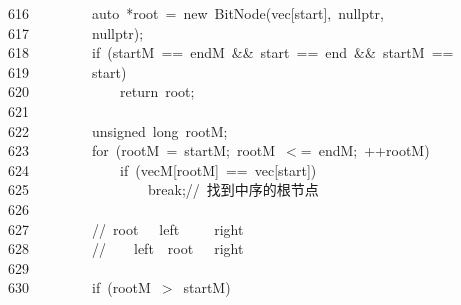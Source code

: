 \documentclass[11pt,a4paper]{ctexart}
\newcommand{\hlstd}[1]{\textcolor[rgb]{0.2,0.2,0.2}{#1}}
\newcommand{\hlslc}[1]{\textcolor[rgb]{0.59,0.59,0.59}{#1}}
\newcommand{\hlopt}[1]{\textcolor[rgb]{0.2,0.2,0.2}{#1}}
\newcommand{\hllin}[1]{\textcolor[rgb]{0.59,0.59,0.59}{#1}}
\newcommand{\hlkwa}[1]{\textcolor[rgb]{0.23,0.42,0.78}{#1}}
\newcommand{\hlkwb}[1]{\textcolor[rgb]{0.63,0,0.31}{#1}}
\newcommand{\hlkwc}[1]{\textcolor[rgb]{0,0.63,0.31}{#1}}
\newcommand{\hlkwd}[1]{\textcolor[rgb]{0.78,0.23,0.41}{#1}}
\begin{document}
\hllin{616\ }\hlstd{}\hlstd{\ \ \ \ \ \ \ \ }\hlstd{}\hlkwc{auto\ }\hlstd{}\hlopt{{*}}\hlstd{root\ }\hlopt{=\ }\hlstd{}\hlkwa{new\ }\hlstd{}\hlkwd{BitNode}\hlstd{}\hlopt{(}\hlstd{vec}\hlopt{{[}}\hlstd{start}\hlopt{{]},\ }\hlstd{}\hlkwc{nullptr}\hlstd{}\hlopt{,\ }\Righttorque\\
\hllin{617\ }\hlstd{}\hlstd{\ \ \ \ \ \ \ \ }\hlstd{}\hlkwc{nullptr}\hlstd{}\hlopt{);}\\
\hllin{618\ }\hlstd{}\hlstd{\ \ \ \ \ \ \ \ }\hlstd{}\hlkwa{if\ }\hlstd{}\hlopt{(}\hlstd{startM\ }\hlopt{==\ }\hlstd{endM\ }\hlopt{\&\&\ }\hlstd{start\ }\hlopt{==\ }\hlstd{end\ }\hlopt{\&\&\ }\hlstd{startM\ }\hlopt{==\ }\Righttorque\\
\hllin{619\ }\hlstd{}\hlstd{\ \ \ \ \ \ \ \ }\hlstd{start}\hlopt{)}\\
\hllin{620\ }\hlstd{}\hlstd{\ \ \ \ \ \ \ \ \ \ \ \ }\hlstd{}\hlkwa{return\ }\hlstd{root}\hlopt{;}\\
\hllin{621\ }\hlstd{}\\
\hllin{622\ }\hlstd{}\hlstd{\ \ \ \ \ \ \ \ }\hlstd{}\hlkwb{unsigned\ long\ }\hlstd{rootM}\hlopt{;}\\
\hllin{623\ }\hlstd{}\hlstd{\ \ \ \ \ \ \ \ }\hlstd{}\hlkwa{for\ }\hlstd{}\hlopt{(}\hlstd{rootM\ }\hlopt{=\ }\hlstd{startM}\hlopt{;\ }\hlstd{rootM\ }\hlopt{$<$=\ }\hlstd{endM}\hlopt{;\ ++}\hlstd{rootM}\hlopt{)}\\
\hllin{624\ }\hlstd{}\hlstd{\ \ \ \ \ \ \ \ \ \ \ \ }\hlstd{}\hlkwa{if\ }\hlstd{}\hlopt{(}\hlstd{vecM}\hlopt{{[}}\hlstd{rootM}\hlopt{{]}\ ==\ }\hlstd{vec}\hlopt{{[}}\hlstd{start}\hlopt{{]})}\\
\hllin{625\ }\hlstd{}\hlstd{\ \ \ \ \ \ \ \ \ \ \ \ \ \ \ \ }\hlstd{}\hlkwa{break}\hlstd{}\hlopt{;}\hlstd{}\hlslc{//\ 找到中序的根节点}\\
\hllin{626\ }\hlstd{}\\
\hllin{627\ }\hlstd{}\hlstd{\ \ \ \ \ \ \ \ }\hlstd{}\hlslc{//\ \textbar root\textbar }\hlstd{\ \ \ }\hlslc{left}\hlstd{\ \ }\hlslc{\textbar }\hlstd{\ \ \ }\hlslc{right}\hlstd{\ \ }\hlslc{\textbar }\\
\hllin{628\ }\hlstd{}\hlstd{\ \ \ \ \ \ \ \ }\hlstd{}\hlslc{//\ \textbar }\hlstd{\ \ \ }\hlslc{left}\hlstd{\ \ }\hlslc{\textbar root\textbar }\hlstd{\ \ \ }\hlslc{right}\hlstd{\ \ }\hlslc{\textbar }\\
\hllin{629\ }\hlstd{}\\
\hllin{630\ }\hlstd{}\hlstd{\ \ \ \ \ \ \ \ }\hlstd{}\hlkwa{if\ }\hlstd{}\hlopt{(}\hlstd{rootM\ }\hlopt{$>$\ }\hlstd{startM}\hlopt{)}\\
\end{document}
